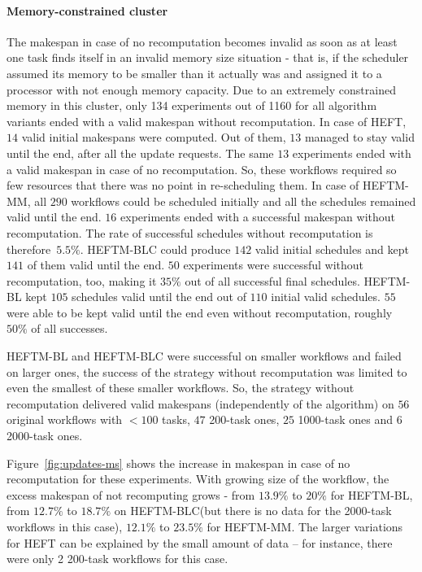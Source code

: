 \documentclass[conference]{IEEEtran}
\newcommand{\algo}[1]{\textsc{#1}}
\newcommand{\heft}{\algo{HEFT}\xspace}
\newcommand{\heftmm}{\algo{HEFTM-MM}\xspace}
\newcommand{\heftbl}{\algo{HEFTM-BL}\xspace}
\newcommand{\heftblc}{\algo{HEFTM-BLC}\xspace}
\begin{document}
    \paragraph{Memory-constrained cluster}
    The makespan in case of no recomputation becomes invalid as soon as at least one task finds itself in an invalid memory size
    situation - that is, if the scheduler assumed its memory to be smaller than it actually was and assigned it to a processor
    with not enough memory capacity.
    Due to an extremely constrained memory in this cluster, only 134 experiments out of 1160 for all algorithm variants
    ended with a valid makespan without recomputation.
    In case of \heft, $14$ valid initial makespans were computed.
    Out of them, $13$ managed to stay valid until the end, after all the update requests.
    The same $13$ experiments ended with a valid makespan in case of no recomputation.
    So, these workflows required so few resources that there was no point in re-scheduling them.
    In case of \heftmm, all $290$ workflows could be scheduled initially and all the schedules remained valid until the end.
    $16$ experiments ended with a successful makespan without recomputation.
    The rate of successful schedules without recomputation is therefore~$5.5\%$.
    \heftblc could produce $142$ valid initial schedules and kept $141$ of them valid until the end.
    $50$ experiments were successful without recomputation, too, making it $35\%$ out of all successful final schedules.
    \heftbl kept $105$ schedules valid until the end out of $110$ initial valid schedules.
    $55$ were able to be kept valid until the end even without recomputation, roughly $50\%$ of all successes.

    \heftbl and \heftblc were successful on smaller workflows and failed on larger ones, the success of the strategy without
    recomputation was limited to even the smallest of these smaller workflows.
    So, the strategy without recomputation delivered valid makespans (independently of the algorithm) on $56$ original
    workflows with $<100$ tasks, $47$ 200-task ones, $25$ 1000-task ones and $6$ 2000-task ones.

    Figure~\ref{fig:updates-ms} shows the increase in makespan in case of no recomputation for these experiments.
    With growing size of the workflow, the excess makespan of not recomputing grows - from $13.9\%$ to $20\%$ for \heftbl,
    from $12.7\%$ to $18.7\%$ on \heftblc (but there is no data for the 2000-task workflows in this case),
    $12.1\%$ to $23.5\%$ for \heftmm.
    The larger variations for \heft can be explained by the small amount of data -- for instance, there were only 2 200-task
    workflows for this case.
\end{document}
